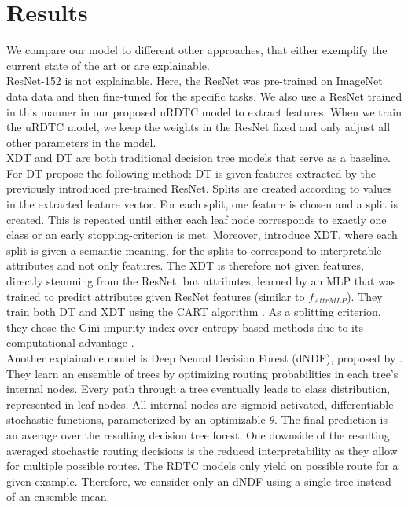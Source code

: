 \documentclass[a4paper,cleardoubleempty,BCOR1cm, 11pt]{report}
\begin{document}


\section{Results}\label{sec:results}
We compare our model to different other approaches, that either exemplify the current state of the art or are explainable.\\
ResNet-152 \cite{he2016deep} is not explainable. Here, the ResNet was pre-trained on ImageNet data \cite{deng2009imagenet} data and then fine-tuned for the specific tasks. We also use a ResNet trained in this manner in our proposed uRDTC model to extract features. When we train the uRDTC model, we keep the weights in the ResNet fixed and only adjust all other parameters in the model.\\
XDT and DT are both traditional decision tree models that serve as a baseline. For DT \citet{alaniz2019explainable} propose the following method: DT is given features extracted by the previously introduced pre-trained ResNet. Splits are created according to values in the extracted feature vector. For each split, one feature is chosen and a split is created. This is repeated until either each leaf node corresponds to exactly one class or an early stopping-criterion is met. Moreover, \citet{alaniz2019explainable} introduce XDT, where each split is given a semantic meaning, for the splits to correspond to interpretable attributes and not only features. The XDT is therefore not given features, directly stemming from the ResNet, but attributes, learned by an MLP that was trained to predict attributes given ResNet features (similar to $f_{AttrMLP}$). They train both DT and XDT using the CART algorithm \cite{breiman1984classification}. As a splitting criterion, they chose the Gini impurity index over entropy-based methods due to its computational advantage \cite{raileanu2004theoretical}.\\
Another explainable model is Deep Neural Decision Forest (dNDF), proposed by \citet{kontschieder2015deep}. They learn an ensemble of trees by optimizing routing probabilities in each tree's internal nodes. Every path through a tree eventually leads to class distribution, represented in leaf nodes. All internal nodes are sigmoid-activated, differentiable stochastic functions, parameterized by an optimizable $\theta$. The final prediction is an average over the resulting decision tree forest. One downside of the resulting averaged stochastic routing decisions is the reduced interpretability as they allow for multiple possible routes. The RDTC models only yield on possible route for a given example. Therefore, we consider only an dNDF using a single tree instead of an ensemble mean.
\end{document}
